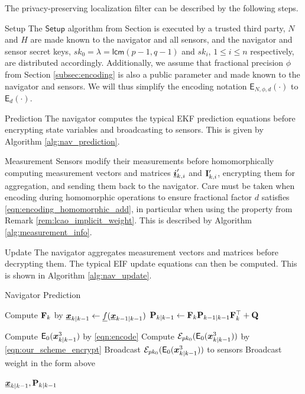 \documentclass[10pt,letterpaper,oneside,twocolumn,journal]{IEEEtran}
\theoremstyle{definition}
\theoremstyle{definition}
\theoremstyle{remark}
\begin{document}
The privacy-preserving localization filter can be described by the following steps.
\begin{LaTeXdescription}
    \item[Setup] The $\mathsf{Setup}$ algorithm from Section  is executed by a trusted third party, $N$ and $H$ are made known to the navigator and all sensors, and the navigator and sensor secret keys, $sk_0=\lambda=\mathsf{lcm}(p-1, q-1)$ and $sk_i$, $1 \leq i \leq n$ respectively, are distributed accordingly. Additionally, we assume that fractional precision $\phi$ from Section \ref{subsec:encoding} is also a public parameter and made known to the navigator and sensors. We will thus simplify the encoding notation $\mathsf{E}_{N,\phi,d}(\cdot)$ to $\mathsf{E}_{d}(\cdot)$.

    \item[Prediction] The navigator computes the typical EKF prediction equations before encrypting state variables and broadcasting to sensors. This is given by Algorithm \ref{alg:nav_prediction}.

    \item[Measurement] Sensors modify their measurements before homomorphically computing measurement vectors and matrices ${\boldsymbol{\underline{i}}}'_{k,i}$ and ${{\mathbf{I}}}'_{k,i}$, encrypting them for aggregation, and sending them back to the navigator. Care must be taken when encoding during homomorphic operations to ensure fractional factor $d$ satisfies \eqref{eqn:encoding_homomorphic_add}, in particular when using the property from Remark \ref{rem:lcao_implicit_weight}. This is described by Algorithm \ref{alg:measurement_info}.

    \item[Update] The navigator aggregates measurement vectors and matrices before decrypting them. The typical EIF update equations can then be computed. This is shown in Algorithm \ref{alg:nav_update}.
\end{LaTeXdescription}

\begin{algorithm}[htbp]
\caption{Navigator Prediction}\label{alg:nav_prediction}
\begin{algorithmic}[1]

    \State Compute ${{\mathbf{F}}}_k$ by 
    \State ${\boldsymbol{\underline{x}}}_{k|k-1} \gets {\underline{f}}({\boldsymbol{\underline{x}}}_{k-1|k-1})$
    \State ${{\mathbf{P}}}_{k|k-1} \gets {\ensuremath{{\mathbf{F}}}}_k{{\mathbf{P}}}_{k-1|k-1}{{\mathbf{F}}}_k^\top + {{\mathbf{Q}}}$

    \State Compute $\mathsf{E}_{0}({\boldsymbol{x}}^3_{k|k-1})$ by \eqref{eqn:encode}
    \State Compute $\mathcal{E}_{pk_0}(\mathsf{E}_{0}({\boldsymbol{x}}^3_{k|k-1}))$ by \eqref{eqn:our_scheme_encrypt}
    \State Broadcast $\mathcal{E}_{pk_0}(\mathsf{E}_{0}({\boldsymbol{x}}^3_{k|k-1}))$ to sensors
        \State Broadcast weight in the form above
    \EndFor

    \State \Return ${\boldsymbol{\underline{x}}}_{k|k-1}, {{\mathbf{P}}}_{k|k-1}$
    \EndProcedure
\end{algorithmic}
\end{algorithm}
\end{document}
